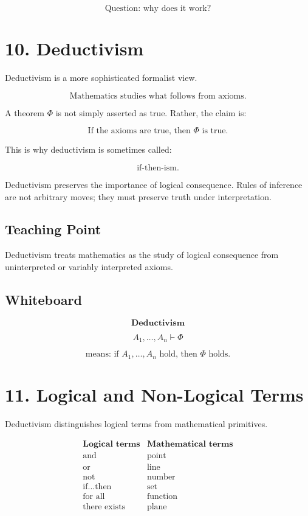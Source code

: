 \documentclass[11pt]{article}
\begin{document}
\[
\text{Question: why does it work?}
\]

\section*{10. Deductivism}

Deductivism is a more sophisticated formalist view.

\[
\boxed{
\text{Mathematics studies what follows from axioms.}
}
\]

A theorem \(\Phi\) is not simply asserted as true. Rather, the claim is:

\[
\text{If the axioms are true, then } \Phi \text{ is true.}
\]

This is why deductivism is sometimes called:

\[
\text{if-then-ism.}
\]

Deductivism preserves the importance of logical consequence. Rules of inference are not
arbitrary moves; they must preserve truth under interpretation.

\subsection*{Teaching Point}

Deductivism treats mathematics as the study of logical consequence from uninterpreted
or variably interpreted axioms.

\subsection*{Whiteboard}

\[
\textbf{Deductivism}
\]

\[
A_1,\ldots,A_n \vdash \Phi
\]

\[
\text{means: if } A_1,\ldots,A_n \text{ hold, then } \Phi \text{ holds.}
\]

\section*{11. Logical and Non-Logical Terms}

Deductivism distinguishes logical terms from mathematical primitives.

\[
\begin{array}{c|c}
\textbf{Logical terms} & \textbf{Mathematical terms} \\
\hline
\text{and} & \text{point} \\
\text{or} & \text{line} \\
\text{not} & \text{number} \\
\text{if...then} & \text{set} \\
\text{for all} & \text{function} \\
\text{there exists} & \text{plane}
\end{array}
\]
\end{document}
